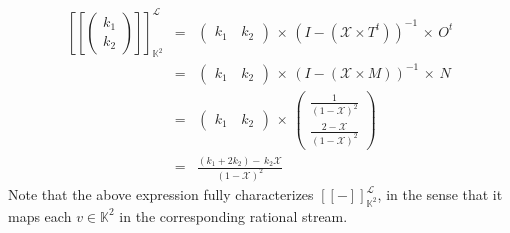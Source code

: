 \documentclass[3p]{elsarticle}
\newcommand{\cbox}[1]{\vspace{0.2cm}\noindent
  \fbox{\parbox{.97\textwidth}{#1}}\vspace{0.2cm}}
\newcommand{\X}{\mathcal{X}}           %
\newcommand{\fL}{\mathcal{L}}    %
\newcommand{\streamproduct}{\times} %
\newcommand{\beh}[3]{\left[\!\left[ #1 \right]\!\right]^{#2}_{#3}} %
\newcommand{\K}{\mathbb{K}}            %
\begin{document}
\begin{eqnarray*}
\beh{\begin{pmatrix} k_1 \\ k_2
\end{pmatrix}}{\fL}{\K^2} & = &
\begin{pmatrix}
k_1 \,  & k_2
\end{pmatrix}
\, \streamproduct \, (I - (\X \streamproduct T^t))^{-1} \,
\streamproduct \, O^t
\\
& = &
\begin{pmatrix}
k_1 \,  & k_2
\end{pmatrix}
\, \streamproduct \, (I - (\X \streamproduct M))^{-1} \,
\streamproduct \, N
\\
& = &
\begin{pmatrix}
k_1 \,  & k_2
\end{pmatrix}
\, \streamproduct \,
\begin{pmatrix}
\frac{1}{(1-\X)^2} \\
\frac{2-\X}{(1-\X)^2}
\end{pmatrix}
\\
& = & \frac{(k_1 + 2 k_2) - \,k_2\X }{(1-\X)^2}
\end{eqnarray*}
Note that the above expression fully characterizes $\beh{-}{\fL}{\K^2}$,
in the sense that it maps each $v\in \K^2$ in the corresponding rational stream.
\end{document}

